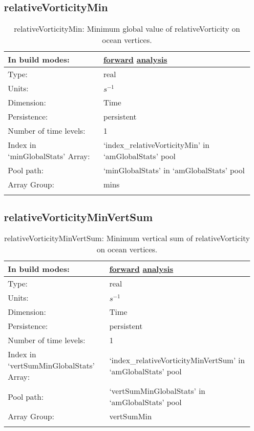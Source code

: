 \subsection[relativeVorticityMin]{relativeVorticityMin}
\label{subsec:var_sec_amGlobalStats_relativeVorticityMin}
\begin{center}
\begin{longtable}{| p{2.0in} | p{4.0in} |}
        \hline 
        In build modes: & \hyperref[subsec:forward_var_tab_amGlobalStats]{forward} \hyperref[subsec:analysis_var_tab_amGlobalStats]{analysis} \\
        \hline 
        Type: & real \\
        \hline 
        Units: & $s^{-1}$ \\
        \hline 
        Dimension: & Time \\
        \hline 
        Persistence: & persistent \\
        \hline 
        Number of time levels: & 1 \\
        \hline 
		 Index in `minGlobalStats' Array: & `index\_relativeVorticityMin' in `amGlobalStats' pool \\
		 \hline 
            Pool path: & `minGlobalStats' in `amGlobalStats' pool \\
		 \hline 
		 Array Group: & mins \\
		 \hline 
    \caption{relativeVorticityMin: Minimum global value of relativeVorticity on ocean vertices.}
\end{longtable}
\end{center}
\subsection[relativeVorticityMinVertSum]{relativeVorticityMinVertSum}
\label{subsec:var_sec_amGlobalStats_relativeVorticityMinVertSum}
\begin{center}
\begin{longtable}{| p{2.0in} | p{4.0in} |}
        \hline 
        In build modes: & \hyperref[subsec:forward_var_tab_amGlobalStats]{forward} \hyperref[subsec:analysis_var_tab_amGlobalStats]{analysis} \\
        \hline 
        Type: & real \\
        \hline 
        Units: & $s^{-1}$ \\
        \hline 
        Dimension: & Time \\
        \hline 
        Persistence: & persistent \\
        \hline 
        Number of time levels: & 1 \\
        \hline 
		 Index in `vertSumMinGlobalStats' Array: & `index\_relativeVorticityMinVertSum' in `amGlobalStats' pool \\
		 \hline 
            Pool path: & `vertSumMinGlobalStats' in `amGlobalStats' pool \\
		 \hline 
		 Array Group: & vertSumMin \\
		 \hline 
    \caption{relativeVorticityMinVertSum: Minimum vertical sum of relativeVorticity on ocean vertices.}
\end{longtable}
\end{center}
